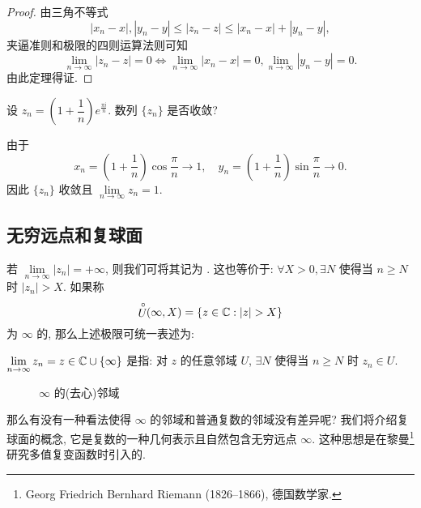 \begin{proof}
  由三角不等式
  \[|x_n-x|,|y_n-y|\le|z_n-z|\le|x_n-x|+|y_n-y|,\]
  夹逼准则和极限的四则运算法则可知
  \[\lim_{n\to\infty}|z_n-z|=0\iff
  \lim_{n\to\infty}|x_n-x|=0,\lim_{n\to\infty}|y_n-y|=0.\]
  由此定理得证.
\end{proof}

\begin{example}
  设 $z_n=\left(1+\dfrac1n\right)e^{\frac{\pi i}n}$. 数列 $\{z_n\}$ 是否收敛?
\end{example}

\begin{solution}
  由于
  \[x_n=\left(1+\frac1n\right)\cos\frac\pi n\to 1,\quad
  y_n=\left(1+\frac1n\right)\sin\frac\pi n\to 0.\]
  因此 $\{z_n\}$ 收敛且 $\lim\limits_{n\to\infty}z_n=1$.
\end{solution}


\subsection{无穷远点和复球面}


若 $\lim\limits_{n\to\infty}|z_n|=+\infty$, 则我们可将其记为 .
这也等价于: $\forall X>0,\exists N$ 使得当 $n\ge N$ 时 $|z_n|>X$.
如果称
  \[\Uc(\infty,X)=\{z\in\BC:|z|>X\}\]
为 $\infty$ 的,
那么上述极限可统一表述为:

\begin{definition}
  $\lim\limits_{n\to\infty}z_n=z\in{\mathbb{C}}\cup{\left\{\infty\right\}}$ 是指: 对 $z$ 的任意邻域 $U$, $\exists N$ 使得当 $n\ge N$ 时 $z_n\in U$.\footnotemark
\end{definition}


\begin{figure}[!h]
  \centering
  \caption{$\infty$ 的(去心)邻域}
\end{figure}

那么有没有一种看法使得 $\infty$ 的邻域和普通复数的邻域没有差异呢?
我们将介绍复球面的概念, 它是复数的一种几何表示且自然包含无穷远点 $\infty$.
这种思想是在黎曼\footnote{
  Georg Friedrich Bernhard Riemann (1826--1866), 德国数学家.
}研究多值复变函数时引入的.

